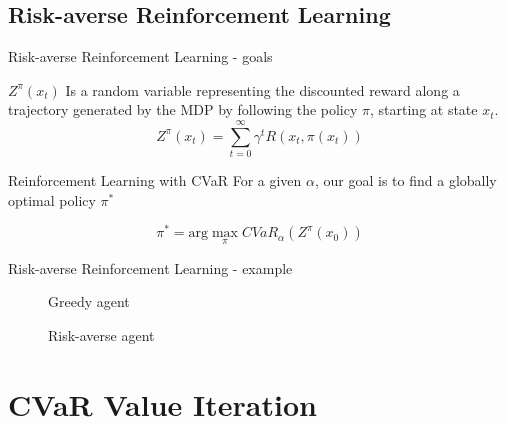 \documentclass{beamer}
\begin{document}

\subsection{Risk-averse Reinforcement Learning}

\begin{frame}{Risk-averse Reinforcement Learning - goals}
\begin{definition}
$Z^\pi(x_t)$ Is a random variable representing the discounted reward along a trajectory generated by the MDP by following the policy $\pi$, starting at state $x_t$.
$$Z^\pi(x_{t})=\sum_{t=0}^\infty \gamma^tR(x_t,\pi(x_t))$$
\end{definition}

\begin{block}{Reinforcement Learning with CVaR}
For a given $\alpha$, our goal is to find a globally optimal policy $\pi^*$

$$\pi^* = \text{arg}\max_\pi CVaR_\alpha(Z^\pi(x_0))$$
\end{block}
\end{frame}


\begin{frame}{Risk-averse Reinforcement Learning - example}
\begin{figure}
    \centering
    \begin{minipage}{0.5\textwidth}
        \centering
        \caption{Greedy agent}
    \end{minipage}\hfill
    \begin{minipage}{0.5\textwidth}
        \centering
        \caption{Risk-averse agent}
    \end{minipage}
\end{figure}
\end{frame}


\section{CVaR Value Iteration}
\end{document}
